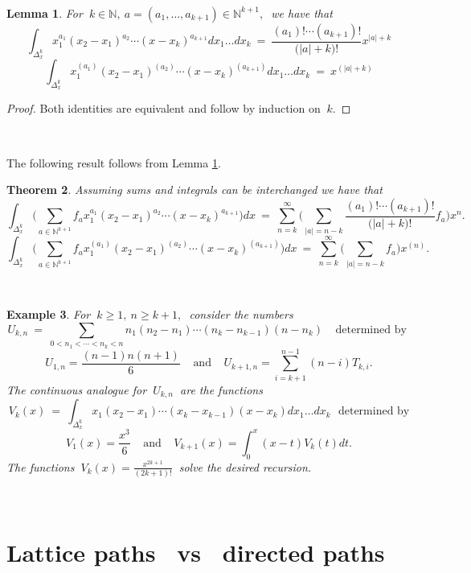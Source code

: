 \documentclass[10pt,leqeq]{article}
\newtheorem{thm}{Theorem}%
\newtheorem{lem}[thm]{Lemma}%
\newtheorem{exmp}[thm]{Example}
\begin{document}
\

\begin{lem}\label{l5}
{\em For $\ k\in \mathbb{N}, \ a=(a_1,\dots,a_{k+1})\in \mathbb{N}^{k+1}, \ $ we have that
$$\int_{\Delta^k_x}x_1^{a_1}(x_2-x_1)^{a_2} \cdots (x-x_k)^{a_{k+1}}dx_1\dots dx_k \  = \ 
\frac{(a_1)!\cdots(a_{k+1})!}{\big(|a| + k\big)!}x^{|a| + k}  $$
$$\int_{\Delta^k_x}x_1^{(a_1)}(x_2-x_1)^{(a_2)} \cdots (x-x_k)^{(a_{k+1})}dx_1\dots dx_k \  =  \  x^{(|a|+k)} $$  }
\end{lem}
\begin{proof}
Both identities are equivalent and follow by induction on $\ k.$ 
\end{proof}

\

The following result follows from  Lemma \ref{l5}. \\


\begin{thm}
{\em Assuming sums and integrals can be interchanged we have that  
$$\int_{\Delta^k_x}\bigg( \sum_{a\in \mathbb{N}^{k+1}}f_a x_1^{a_1}(x_2-x_1)^{a_2} \cdots (x-x_k)^{a_{k+1}} \bigg)dx \  = \
\sum_{n=k}^{\infty}\bigg(  \sum_{|a|=n-k} \frac{(a_1)!\cdots(a_{k+1})!}{\big(|a| + k\big)!}f_a \bigg) x^n.$$
$$\int_{\Delta^k_x}\bigg( \sum_{a\in \mathbb{N}^{k+1}}f_a x_1^{(a_1)}(x_2-x_1)^{(a_2)} \cdots (x-x_k)^{(a_{k+1})} \bigg)dx \  = \
\sum_{n=k}^{\infty}\bigg(  \sum_{|a|=n-k} f_a \bigg)  x^{(n)}.$$ }
\end{thm}


\

\begin{exmp}
{\em For $\ k \geq 1, \ n \geq k+1, \ $ consider the numbers
$$U_{k,n} \ = \ \sum_{0<n_1 <  \cdots < n_k < n} n_1(n_2-n_1) \cdots
(n_k-n_{k-1})(n-n_k) \ \ \ \ \  \mbox{determined by }$$
$$U_{1,n}= \frac{(n-1)n(n+1)}{6} \ \ \ \ \ \mbox{and}\ \ \ \ \ U_{k+1,n}  =  \sum_{i=k+1}^{n-1}(n-i)T_{k,i}.$$
The continuous analogue for $\ U_{k,n} \ $ are the functions
$$V_{k}(x) \ = \ \int_{\Delta^k_x}x_1(x_2-x_1) \cdots
(x_k-x_{k-1})(x-x_k) dx_1\dots dx_k \ \ \ 
\mbox{determined by} $$
$$V_{1}(x)= \frac{x^3}{6} \ \ \ \ \  \mbox{and} \ \ \ \ \ V_{k+1}(x)  =  \int_{0}^{x}(x-t)V_{k}(t)dt.$$
The functions $\ \displaystyle V_{k}(x)= \frac{x^{2k+1}}{(2k+1)!} \ $ solve the desired recursion.
}
\end{exmp}

\





\section{Lattice paths \ vs \ directed paths}
\end{document}
